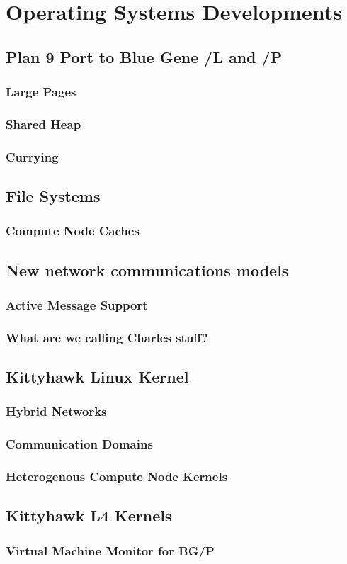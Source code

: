 \chapter{Operating Systems Developments}
\section{Plan 9 Port to Blue Gene /L and /P}
\subsection{Large Pages}
\subsection{Shared Heap}
\subsection{Currying}
\section{File Systems}
\subsection{Compute Node Caches}
\section{New network communications models}
\subsection{Active Message Support}
\subsection{What are we calling Charles stuff?}
\section{Kittyhawk Linux Kernel}
\subsection{Hybrid Networks}
\subsection{Communication Domains}
\subsection{Heterogenous Compute Node Kernels}
\section{Kittyhawk L4 Kernels}
\subsection{Virtual Machine Monitor for BG/P}
